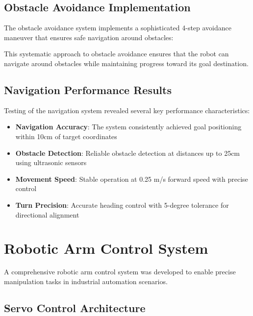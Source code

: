 \documentclass{book}
\begin{document}
\subsection{Obstacle Avoidance Implementation}

\par\noindent The obstacle avoidance system implements a sophisticated 4-step avoidance maneuver that ensures safe navigation around obstacles:



\par\noindent This systematic approach to obstacle avoidance ensures that the robot can navigate around obstacles while maintaining progress toward its goal destination.

\subsection{Navigation Performance Results}

\par\noindent Testing of the navigation system revealed several key performance characteristics:

\begin{itemize}
\item \textbf{Navigation Accuracy}: The system consistently achieved goal positioning within 10cm of target coordinates
\item \textbf{Obstacle Detection}: Reliable obstacle detection at distances up to 25cm using ultrasonic sensors
\item \textbf{Movement Speed}: Stable operation at 0.25 m/s forward speed with precise control
\item \textbf{Turn Precision}: Accurate heading control with 5-degree tolerance for directional alignment
\end{itemize}

\section{Robotic Arm Control System}

\par\noindent A comprehensive robotic arm control system was developed to enable precise manipulation tasks in industrial automation scenarios.

\subsection{Servo Control Architecture}
\end{document}
